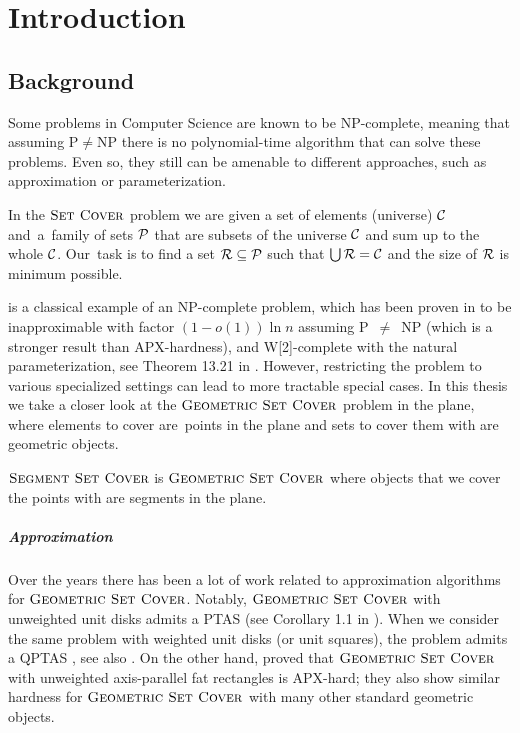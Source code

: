 \chapter{Introduction}
\section{Background}
Some problems in Computer Science are known to be NP-complete,
meaning that assuming P$\neq$NP there is no polynomial-time
algorithm that can solve these problems.
Even so, they still can be amenable to different approaches,
such as approximation or parameterization.

\begin{defi}
In the \textbf{$\textsc{Set Cover}$} problem we are given a set of elements (universe)
$\mathcal{C}$ and~a~family of sets $\mathcal{P}$ that are subsets of the universe $\mathcal{C}$
and sum up to the whole $\mathcal{C}$.
Our~task is to find a set $\mathcal{R} \subseteq \mathcal{P}$
such that $\bigcup \mathcal{R} = \mathcal{C}$ and the size of $\mathcal{R}$ is minimum possible.
\end{defi}

\SetCover is a classical example of an NP-complete problem,
which has been proven
in \cite{set_cover_inapproximation} to be
inapproximable with factor $(1-o(1))\ln n$ assuming P~$\neq$~NP
(which is a stronger result than APX-hardness),
and W[2]-complete with the natural parameterization,
see Theorem 13.21 in \cite{platypus_book}.
However, restricting the problem to various specialized settings
can lead to more tractable special cases.
In this thesis we take a closer look at the $\textsc{Geometric Set Cover}$ problem
in the plane, where elements to cover are~points in the plane
and sets to cover them with are geometric objects.

\begin{defi}
\textbf{$\textsc{Segment Set Cover}$} is $\textsc{Geometric Set Cover}$ where
objects that we cover the points with are segments in the plane.
\end{defi}

\paragraph{Approximation}
Over the years there has been a lot of work related to approximation
algorithms for $\textsc{Geometric Set Cover}$. Notably,
$\textsc{Geometric Set Cover}$ with unweighted unit disks admits a PTAS (see
Corollary 1.1 in \cite{unit_disks}). When we consider the same problem
with weighted unit disks (or unit squares), the problem admits a QPTAS
\cite{settling_apx_hardness}, see also \cite{voronoi_true}.
On the other hand, \cite{rectangles_apx_hard} 
proved that $\textsc{Geometric Set Cover}$ with unweighted axis-parallel fat rectangles
is APX-hard; they also show similar hardness
for $\textsc{Geometric Set Cover}$ with many other standard geometric objects.

